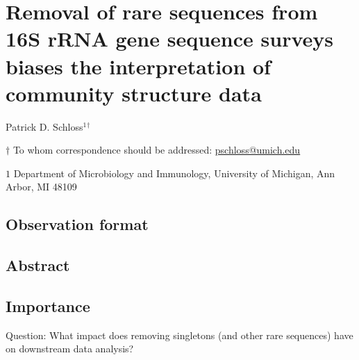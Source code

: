 \documentclass[11pt,]{article}
\title{}
\author{}
\date{}
\begin{document}
\vspace*{10mm}

\hypertarget{removal-of-rare-sequences-from-16s-rrna-gene-sequence-surveys-biases-the-interpretation-of-community-structure-data}{%
\section{Removal of rare sequences from 16S rRNA gene sequence surveys
biases the interpretation of community structure
data}\label{removal-of-rare-sequences-from-16s-rrna-gene-sequence-surveys-biases-the-interpretation-of-community-structure-data}}

\vspace{35mm}

Patrick D. Schloss\({^1}\)\({^\dagger}\)

\vspace{40mm}

\(\dagger\) To whom correspondence should be addressed:
\href{mailto:pschloss@umich.edu}{pschloss@umich.edu}

\(1\) Department of Microbiology and Immunology, University of Michigan,
Ann Arbor, MI 48109

\vspace{35mm}

\hypertarget{observation-format}{%
\subsection{Observation format}\label{observation-format}}

\newpage
\linenumbers

\hypertarget{abstract}{%
\subsection{Abstract}\label{abstract}}

\newpage

\hypertarget{importance}{%
\subsection{Importance}\label{importance}}

\newpage

Question: What impact does removing singletons (and other rare
sequences) have on downstream data analysis?
\end{document}
